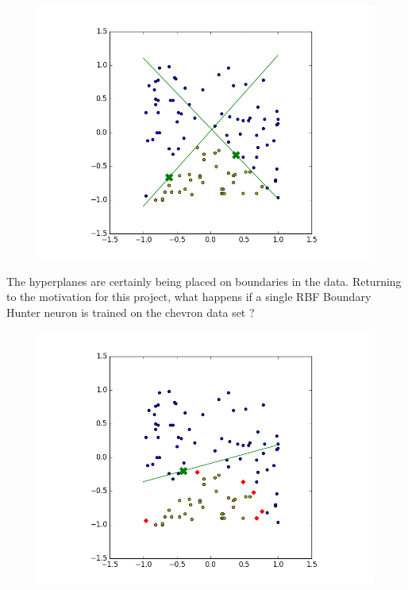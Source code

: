 \documentclass[notitlepage]{report}
\theoremstyle{definition}
\begin{document}
\begin{figure}[H]
  \centering
  \begin{minipage}[b]{0.7\textwidth}
    \includegraphics[width=\textwidth]{RBFN-BH-03.png}
    \caption{}
    \label{fig:RBFN-BH-03}
  \end{minipage}
  \hfill
\end{figure}

The hyperplanes are certainly being placed on boundaries in the data. Returning to the motivation for this project, what happens if a single RBF Boundary Hunter neuron is trained on the chevron data set ?

\begin{figure}[H]
  \centering
  \begin{minipage}[b]{0.7\textwidth}
    \includegraphics[width=\textwidth]{RBFN-BH-04.png}
    \caption{}
    \label{fig:RBFN-BH-04}
  \end{minipage}
  \hfill
\end{figure}
\end{document}
